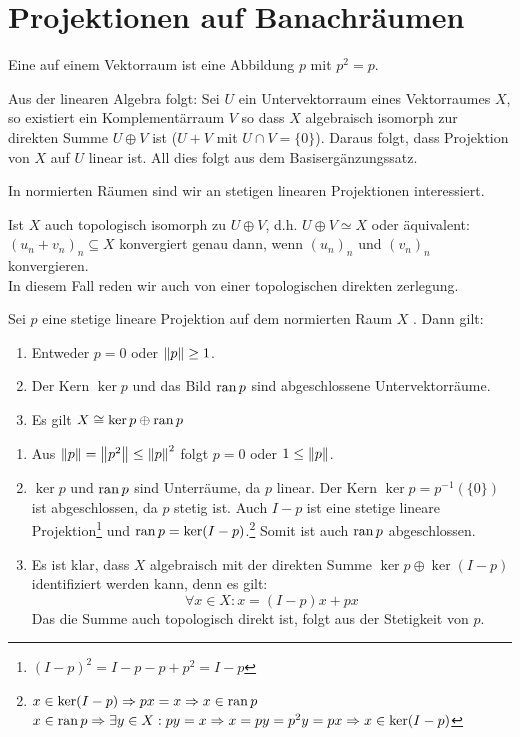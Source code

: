 \chapter{Projektionen auf Banachr\"aumen}
\begin{definition}
	Eine  auf einem Vektorraum ist eine Abbildung $ p $ mit $ p^2=p $.
\end{definition}
\begin{bemerkung*}
	Aus der linearen Algebra folgt: Sei $ U $ ein Untervektorraum eines Vektorraumes $ X $, so existiert ein Komplement\"arraum $ V $ so dass $ X $ algebraisch isomorph zur direkten Summe $ U\oplus V $ ist ($ U+V $ mit $ U\cap V=\lbrace 0\rbrace $). Daraus folgt, dass Projektion von $ X $ auf $ U $ linear ist. All dies folgt aus dem Basiserg\"anzungssatz.
\end{bemerkung*}
In normierten R\"aumen sind wir an stetigen linearen Projektionen interessiert.
\begin{bemerkung*}
	Ist $ X $ auch topologisch isomorph zu $ U\oplus V $, d.h. $ U\oplus V\simeq X $ oder \"aquivalent: $ (u_n+v_n)_n\subseteq X $ konvergiert genau dann, wenn $ (u_n)_n $ und $ (v_n)_n $ konvergieren.\\
	In diesem Fall reden wir auch von einer topologischen direkten zerlegung.
\end{bemerkung*}
\begin{lemma}
	Sei $ p $ eine stetige lineare Projektion auf dem normierten Raum $ X $ . Dann gilt:
	\begin{enumerate}
		\item Entweder $ p=0 $ oder $ \left\|p\right\|\geq 1 $.
		\item Der Kern $ \ker p $ und das Bild $ \operatorname{ran} p $ sind abgeschlossene Untervektorr\"aume.
		\item Es gilt $ X\cong\ker p\oplus\operatorname{ran} p $
	\end{enumerate}
\end{lemma}
\begin{beweis}
	\begin{enumerate}
		\item Aus $ \left\|p\right\|=\left\|p^2\right\|\leq\left\|p\right\|^2 $ folgt $ p=0 $ oder $ 1\leq\left\|p\right\| $.
		\item $ \ker p $ und $ \operatorname{ran} p $ sind Unterr\"aume, da $ p $ linear. Der Kern $ \ker p=p^{-1}(\lbrace 0\rbrace) $ ist abgeschlossen, da $ p $ stetig ist. Auch $ I-p $ ist eine stetige lineare Projektion\footnote{$ (I-p)^2=I-p-p+p^2=I-p $} und $ \operatorname{ran} p=\ker(I-p) $.\footnote{$ x\in\ker(I-p)\Rightarrow px=x\Rightarrow x\in\operatorname{ran} p $\\ $ x\in\operatorname{ran} p\Rightarrow\exists y\in X: py=x\Rightarrow x=py=p^2y=px\Rightarrow x\in\ker(I-p) $} Somit ist auch $ \operatorname{ran} p $ abgeschlossen.
		\item Es ist klar, dass $ X $ algebraisch mit der direkten Summe $ \ker p\oplus\ker(I-p)$ identifiziert werden kann, denn es gilt:
		\[ \forall x\in X: x=(I-p)x+px \]
		Das die Summe auch topologisch direkt ist, folgt aus der Stetigkeit von $ p $. 
	\end{enumerate}
\end{beweis}
